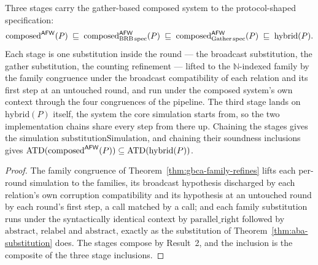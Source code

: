 \begin{theorem}
  \label{thm:aba-afw-substitution}
  \leanok
  Three stages carry the gather-based composed system to the protocol-shaped specification:
  \[
    \mathrm{composed}^{\mathsf{AFW}}(P) \;\sqsubseteq\; \mathrm{composed}^{\mathsf{AFW}}_{\mathrm{BRB}\,\mathrm{spec}}(P)
      \;\sqsubseteq\; \mathrm{composed}^{\mathsf{AFW}}_{\mathrm{Gather}\,\mathrm{spec}}(P) \;\sqsubseteq\; \mathrm{hybrid}(P).
  \]
  Each stage is one substitution inside the round --- the broadcast substitution, the gather substitution, the counting refinement --- lifted to the $\mathbb{N}$-indexed family by the family congruence under the broadcast compatibility of each relation and its first step at an untouched round, and run under the composed system's own context through the four congruences of the pipeline.
  The third stage lands on $\mathrm{hybrid}(P)$ itself, the system the core simulation starts from, so the two implementation chains share every step from there up.
  Chaining the stages gives the simulation $\mathrm{substitutionSimulation}$, and chaining their soundness inclusions gives $\operatorname{ATD}(\mathrm{composed}^{\mathsf{AFW}}(P)) \subseteq \operatorname{ATD}(\mathrm{hybrid}(P))$.
\end{theorem}

\begin{proof}\leanok
  The family congruence of Theorem~\ref{thm:gbca-family-refines} lifts each per-round simulation to the families, its broadcast hypothesis discharged by each relation's own corruption compatibility and its hypothesis at an untouched round by each round's first step, a call matched by a call; and each family substitution runs under the syntactically identical context by $\mathrm{parallel\_right}$ followed by $\mathrm{abstract}$, $\mathrm{relabel}$ and $\mathrm{abstract}$, exactly as the substitution of Theorem~\ref{thm:aba-substitution} does.
  The stages compose by Result~2, and the inclusion is the composite of the three stage inclusions.
\end{proof}
